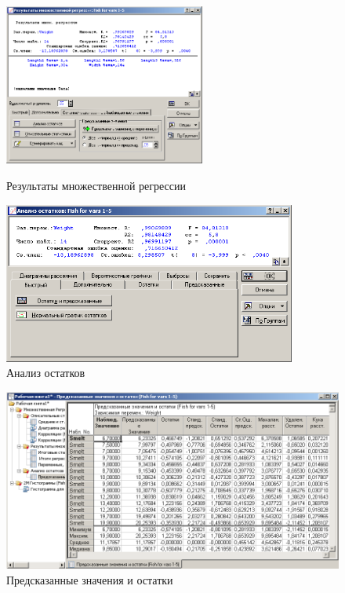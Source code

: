 \begin{figure}[!h]
  \centering
  \begin{minipage}{0.29\textwidth}
    \centering

    \includegraphics[height=5.3cm]
    {inc/var5__24.PNG}

    \caption{Результаты множественной регрессии}
    \label{fig:var5__24}
  \end{minipage}
  \begin{minipage}{0.69\textwidth}
    \centering

    \includegraphics[height=5.3cm]
    {inc/var5__25.PNG}

    \caption{Анализ остатков}
    \label{fig:var5__25}
  \end{minipage}
\end{figure}

\begin{figure}[!h]
  \centering

  \includegraphics[width=14cm]
  {inc/var5__26.PNG}

  \caption{Предсказанные значения и остатки}

  \label{fig:var5__26}
\end{figure}

